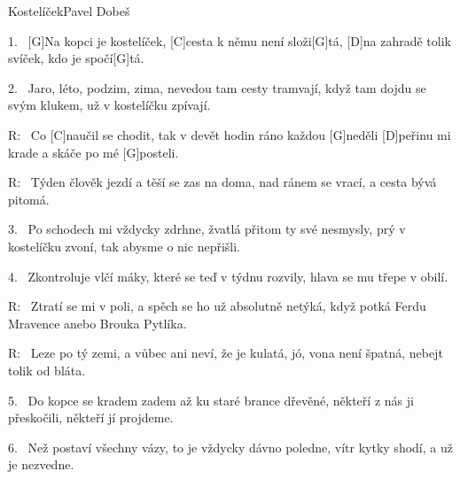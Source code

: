 \begin{song}{Kostelíček}{Pavel Dobeš}

\begin{xverse}{1.~}
[G]Na kopci je kostelíček, [C]cesta k němu není složi[G]tá,
[D]na zahradě tolik svíček, kdo je spočí[G]tá.
\end{xverse}

\begin{xverse}{2.~}
Jaro, léto, podzim, zima, nevedou tam cesty tramvají,
když tam dojdu se svým klukem, už v kostelíčku zpívají.
\end{xverse}

\begin{xverse}{R:~}
Co [C]naučil se chodit, tak v devět hodin ráno každou [G]neděli
[D]peřinu mi krade a skáče po mé [G]posteli.
\end{xverse}

\begin{xverse}{R:~}
Týden člověk jezdí a těší se zas na doma,
nad ránem se vrací, a cesta bývá pitomá.
\end{xverse}

\begin{xverse}{3.~}
Po schodech mi vždycky zdrhne, žvatlá přitom ty své nesmysly,
prý v kostelíčku zvoní, tak abysme o nic nepřišli.
\end{xverse}

\begin{xverse}{4.~}
Zkontroluje vlčí máky, které se teď v týdnu rozvily,
hlava se mu třepe v obilí.
\end{xverse}

\begin{xverse}{R:~}
Ztratí se mi v poli, a spěch se ho už absolutně netýká,
když potká Ferdu Mravence anebo Brouka Pytlíka.
\end{xverse}

\begin{xverse}{R:~}
Leze po tý zemi, a vůbec ani neví, že je kulatá,
jó, vona není špatná, nebejt tolik od bláta.
\end{xverse}

\begin{xverse}{5.~}
Do kopce se kradem zadem až ku staré brance dřevěné,
někteří z nás ji přeskočili, někteří jí projdeme.
\end{xverse}

\begin{xverse}{6.~}
Než postaví všechny vázy, to je vždycky dávno poledne,
vítr kytky shodí, a už je nezvedne.
\end{xverse}


\end{song}
